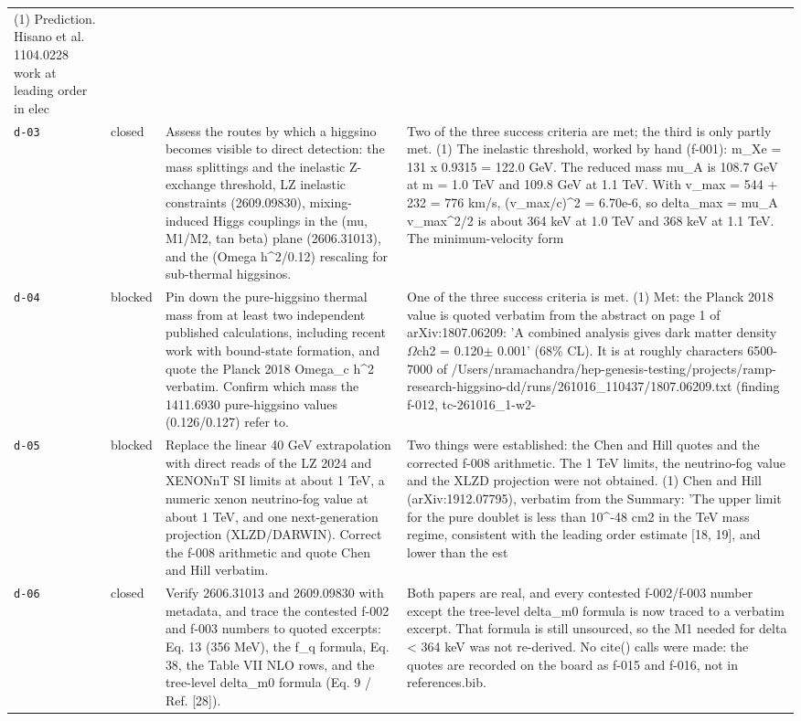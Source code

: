 \documentclass[11pt,a4paper]{article}
\begin{document}
\begin{longtable}{@{}p{}p{}p{}p{}@{}}
(1) Prediction. Hisano et al. 1104.0228 work at leading order in elec \\
\texttt{d-03} & closed & Assess the routes by which a higgsino becomes visible to direct detection: the mass splittings and the inelastic Z-exchange threshold, LZ inelastic constraints (2609.09830), mixing-induced Higgs couplings in the (mu, M1/M2, tan beta) plane (2606.31013), and the (Omega h\textasciicircum{}2/0.12) rescaling for sub-thermal higgsinos. & Two of the three success criteria are met; the third is only partly met. (1) The inelastic threshold, worked by hand (f-001): m\_Xe = 131 x 0.9315 = 122.0 GeV. The reduced mass mu\_A is 108.7 GeV at m = 1.0 TeV and 109.8 GeV at 1.1 TeV. With v\_max = 544 + 232 = 776 km/s, (v\_max/c)\textasciicircum{}2 = 6.70e-6, so delta\_max = mu\_A v\_max\textasciicircum{}2/2 is about 364 keV at 1.0 TeV and 368 keV at 1.1 TeV. The minimum-velocity form \\
\texttt{d-04} & blocked & Pin down the pure-higgsino thermal mass from at least two independent published calculations, including recent work with bound-state formation, and quote the Planck 2018 Omega\_c h\textasciicircum{}2 verbatim. Confirm which mass the 1411.6930 pure-higgsino values (0.126/0.127) refer to. & One of the three success criteria is met. (1) Met: the Planck 2018 value is quoted verbatim from the abstract on page 1 of arXiv:1807.06209: 'A combined analysis gives dark matter density $\Omega$ch2 = 0.120$\pm$ 0.001' (68\% CL). It is at roughly characters 6500-7000 of /Users/nramachandra/hep-genesis-testing/projects/ramp-research-higgsino-dd/runs/261016\_110437/1807.06209.txt (finding f-012, tc-261016\_1-w2- \\
\texttt{d-05} & blocked & Replace the linear 40 GeV extrapolation with direct reads of the LZ 2024 and XENONnT SI limits at about 1 TeV, a numeric xenon neutrino-fog value at about 1 TeV, and one next-generation projection (XLZD/DARWIN). Correct the f-008 arithmetic and quote Chen and Hill verbatim. & Two things were established: the Chen and Hill quotes and the corrected f-008 arithmetic. The 1 TeV limits, the neutrino-fog value and the XLZD projection were not obtained. (1) Chen and Hill (arXiv:1912.07795), verbatim from the Summary: 'The upper limit for the pure doublet is less than 10\textasciicircum{}-48 cm2 in the TeV mass regime, consistent with the leading order estimate [18, 19], and lower than the est \\
\texttt{d-06} & closed & Verify 2606.31013 and 2609.09830 with metadata, and trace the contested f-002 and f-003 numbers to quoted excerpts: Eq. 13 (356 MeV), the f\_q formula, Eq. 38, the Table VII NLO rows, and the tree-level delta\_m0 formula (Eq. 9 / Ref. [28]). & Both papers are real, and every contested f-002/f-003 number except the tree-level delta\_m0 formula is now traced to a verbatim excerpt. That formula is still unsourced, so the M1 needed for delta \textless{} 364 keV was not re-derived. No cite() calls were made: the quotes are recorded on the board as f-015 and f-016, not in references.bib.


\end{longtable}
\end{document}
